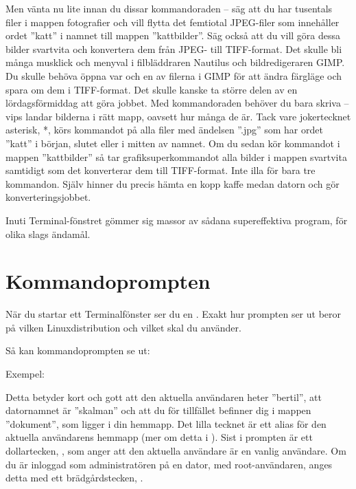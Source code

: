 \documentclass[a4paper,final]{memoir} %
\begin{document}
Men vänta nu lite innan du dissar kommandoraden -- säg att du har tusentals filer i mappen fotografier och vill flytta det femtiotal JPEG-filer som innehåller ordet ''katt'' i namnet till mappen ''kattbilder''. Säg också att du vill göra dessa bilder svartvita och konvertera dem från JPEG- till TIFF-format. Det skulle bli många musklick och menyval i filbläddraren Nautilus och bildredigeraren GIMP. Du skulle behöva öppna var och en av filerna i GIMP för att ändra färgläge och spara om dem i TIFF-format. Det skulle kanske ta större delen av en lördagsförmiddag att göra jobbet. Med kommandoraden behöver du bara skriva  -- vips landar bilderna i rätt mapp, oavsett hur många de är. Tack vare jokertecknet asterisk, *, körs kommandot  på alla filer med ändelsen ''.jpg'' som har ordet ''katt'' i början, slutet eller i mitten av namnet. Om du sedan kör kommandot    i mappen ''kattbilder'' så tar grafiksuperkommandot  alla bilder i mappen svartvita samtidigt som det konverterar dem till TIFF-format. Inte illa för bara tre kommandon. Själv hinner du precis hämta en kopp kaffe medan datorn och   gör konverteringsjobbet. 

Inuti Terminal-fönstret gömmer sig massor av sådana supereffektiva program, för olika slags ändamål.

\section{Kommandoprompten}\label{sec:prompt}

När du startar ett Terminalfönster ser du en . Exakt hur prompten ser ut beror på vilken Linuxdistribution och vilket skal du använder.

\newcommand{\xcaption}[1]{\par\quarterskip\textsf{\small#1}}



Så kan kommandoprompten se ut:


Exempel:


Detta betyder kort och gott att den aktuella användaren heter ''bertil'', att datornamnet är ''skalman'' och att du för tillfället befinner dig i mappen ''dokument'', som ligger i din hemmapp. Det lilla tecknet \xdefinitionstyle{\xoption{\texttildelow{}}} är ett alias för den aktuella användarens hemmapp (mer om detta i ). Sist i prompten är ett dollartecken, , som anger att den aktuella användare är en vanlig användare. Om du är inloggad som administratören på en dator, med root-användaren, anges detta med ett brädgårdstecken, .
\end{document}
